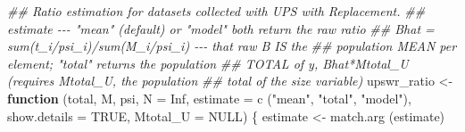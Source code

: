 \documentclass[
  letterpaper,
  DIV=11,
  numbers=noendperiod]{scrreprt}
\newenvironment{Shaded}{\begin{snugshade}}{\end{snugshade}}
\newcommand{\AttributeTok}[1]{\textcolor[rgb]{0.40,0.45,0.13}{#1}}
\newcommand{\ConstantTok}[1]{\textcolor[rgb]{0.56,0.35,0.01}{#1}}
\newcommand{\ControlFlowTok}[1]{\textcolor[rgb]{0.00,0.23,0.31}{\textbf{#1}}}
\newcommand{\DocumentationTok}[1]{\textcolor[rgb]{0.37,0.37,0.37}{\textit{#1}}}
\newcommand{\FunctionTok}[1]{\textcolor[rgb]{0.28,0.35,0.67}{#1}}
\newcommand{\NormalTok}[1]{\textcolor[rgb]{0.00,0.23,0.31}{#1}}
\newcommand{\OtherTok}[1]{\textcolor[rgb]{0.00,0.23,0.31}{#1}}
\newcommand{\StringTok}[1]{\textcolor[rgb]{0.13,0.47,0.30}{#1}}
\renewcommand{\[}{\begin{equation}}
\renewcommand{\]}{\end{equation}}
\begin{document}
\begin{Shaded}
\begin{Highlighting}[]
\DocumentationTok{\#\# Ratio estimation for datasets collected with UPS with Replacement.}
\DocumentationTok{\#\# estimate {-}{-}{-} "mean" (default) or "model" both return the raw ratio}
\DocumentationTok{\#\#              Bhat = sum(t\_i/psi\_i)/sum(M\_i/psi\_i) {-}{-}{-} that raw B IS the}
\DocumentationTok{\#\#              population MEAN per element; "total" returns the population}
\DocumentationTok{\#\#              TOTAL of y, Bhat*Mtotal\_U (requires Mtotal\_U, the population}
\DocumentationTok{\#\#              total of the size variable)}
\NormalTok{upswr\_ratio }\OtherTok{\textless{}{-}} \ControlFlowTok{function}\NormalTok{ (total, M, psi, }\AttributeTok{N =} \ConstantTok{Inf}\NormalTok{, }\AttributeTok{estimate =} \FunctionTok{c}\NormalTok{ (}\StringTok{"mean"}\NormalTok{, }\StringTok{"total"}\NormalTok{, }\StringTok{"model"}\NormalTok{),}
                          \AttributeTok{show.details =} \ConstantTok{TRUE}\NormalTok{, }\AttributeTok{Mtotal\_U =} \ConstantTok{NULL}\NormalTok{)}
\NormalTok{\{}
\NormalTok{  estimate }\OtherTok{\textless{}{-}} \FunctionTok{match.arg}\NormalTok{ (estimate)}


\end{Highlighting}
\end{Shaded}
\end{document}
